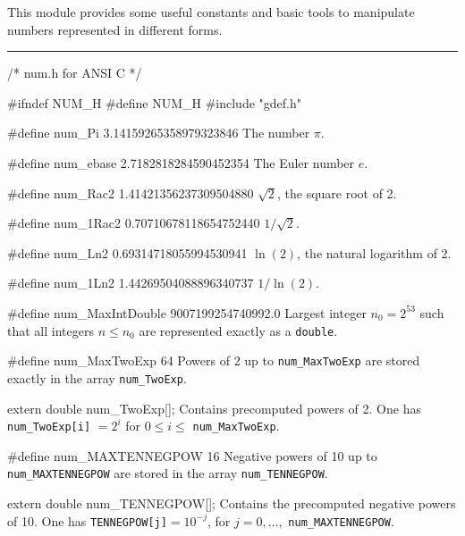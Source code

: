 
This module provides some useful constants and basic tools to
manipulate numbers represented in different forms.

\bigskip\hrule

\code\hide
/* num.h for ANSI C */

#ifndef NUM_H
#define NUM_H
\endhide
#include "gdef.h"
\endcode

\code

#define num_Pi     3.14159265358979323846
\endcode
  \tab The number $\pi$.
  \endtab
\code

#define num_ebase  2.7182818284590452354
\endcode
  \tab The Euler number $e$.
  \endtab
\code

#define num_Rac2   1.41421356237309504880
\endcode
  \tab $\sqrt{2}$, the square root of 2.
  \endtab
\code

#define num_1Rac2  0.70710678118654752440
\endcode
  \tab $1/\sqrt{2}$.
  \endtab
\code

#define num_Ln2    0.69314718055994530941
\endcode
  \tab $\ln(2)$, the natural logarithm of 2.
  \endtab
\code

#define num_1Ln2   1.44269504088896340737
\endcode
  \tab $1 / \ln(2)$.
  \endtab
\code

#define num_MaxIntDouble   9007199254740992.0
\endcode
  \tab Largest integer $n_0 = 2^{53}$ such that all integers
  $n \le n_0$ are represented  exactly as a {\tt double}.
  \endtab


\code

#define num_MaxTwoExp   64
\endcode
  \tab Powers of 2 up to {\tt num\_MaxTwoExp} are stored exactly
  in the array {\tt num\_TwoExp}.
  \endtab
\code

extern double num_TwoExp[];
\endcode
  \tab  Contains precomputed powers of 2.
  One has {\tt num\_TwoExp[i]} $= 2^i$ for $0 \le i \le$
  {\tt num\_MaxTwoExp}.
\endtab
\code

#define num_MAXTENNEGPOW   16
\endcode
  \tab Negative powers of 10 up to {\tt num\_MAXTENNEGPOW} are stored
  in the array {\tt num\_TENNEGPOW}.
  \endtab
\code

extern double num_TENNEGPOW[];
\endcode
 \tab Contains the precomputed negative powers of 10.
   One has {\tt TENNEGPOW[j]}$ = 10^{-j}$, for $j=0,\ldots,$
 {\tt num\_MAXTENNEGPOW}.
\endtab


\code

